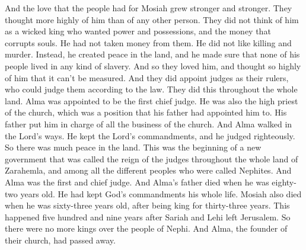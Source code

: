 And the love that the people had for Mosiah grew stronger and stronger. They thought more highly of him than of any other person. They did not think of him as a wicked king who wanted power and possessions, and the money that corrupts souls. He had not taken money from them. He did not like killing and murder. Instead, he created peace in the land, and he made sure that none of his people lived in any kind of slavery. And so they loved him, and thought so highly of him that it can't be measured.
\bverse \iffalse And it came to pass that they did appoint judges to rule over them, or to judge them according to the law; and this they did throughout all the land. \fi
And they did appoint judges as their rulers, who could judge them according to the law. They did this throughout the whole land.
\bverse \iffalse And it came to pass that Alma was appointed to be the first chief judge, he being also the high priest, his father having conferred the office upon him, and having given him the charge concerning all the affairs of the church. \fi
Alma was appointed to be the first chief judge. He was also the high priest of the church, which was a position that his father had appointed him to. His father put him in charge of all the business of the church.
\bverse \iffalse And now it came to pass that Alma did walk in the ways of the Lord, and he did keep his commandments, and he did judge righteous judgments; and there was continual peace through the land. \fi
And Alma walked in the Lord's ways. He kept the Lord's commandments, and he judged righteously. So there was much peace in the land.
\bverse \iffalse And thus commenced the reign of the judges throughout all the land of Zarahemla, among all the people who were called the Nephites; and Alma was the first and chief judge. \fi
This was the beginning of a new government that was called the reign of the judges throughout the whole land of Zarahemla, and among all the different peoples who were called Nephites. And Alma was the first and chief judge.
\bverse \iffalse And now it came to pass that his father died, being eighty and two years old, having lived to fulfil the commandments of God. \fi
And Alma's father died when he was eighty-two years old. He had kept God's commandments his whole life.
\bverse \iffalse And it came to pass that Mosiah died also, in the thirty and third year of his reign, being sixty and three years old; making in the whole, five hundred and nine years from the time Lehi left Jerusalem. \fi
Mosiah also died when he was sixty-three years old, after being king for thirty-three years. This happened five hundred and nine years after Sariah and Lehi left Jerusalem.
\bverse \iffalse And thus ended the reign of the kings over the people of Nephi; and thus ended the days of Alma, who was the founder of their church. \fi
So there were no more kings over the people of Nephi. And Alma, the founder of their church, had passed away.

